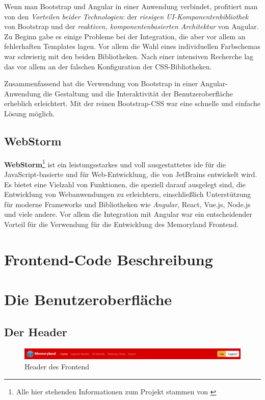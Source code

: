 Wenn man Bootstrap und Angular in einer Anwendung verbindet, profitiert man von den \emph{Vorteilen beider Technologien}: der \emph{riesigen UI-Komponentenbibliothek} von Bootstrap und der \emph{reaktiven, komponentenbasierten Architektur} von Angular. Zu Beginn gabe es einige Probleme bei der Integration, die aber vor allem an fehlerhaften Templates lagen. Vor allem die Wahl eines individuellen Farbschemas war schwierig mit den beiden Bibliotheken. Nach einer intensiven Recherche lag das vor allem an der falschen Konfiguration der CSS-Bibliotheken.

Zusammenfassend hat die Verwendung von Bootstrap in einer Angular-Anwendung die Gestaltung und die Interaktivität der Benutzeroberfläche erheblich erleichtert. Mit der reinen Bootstrap-CSS war eine schnelle und einfache Lösung möglich.


\subsection{WebStorm}

\textbf{WebStorm}\footnote{Alle hier stehenden Informationen zum Projekt stammen von \cite{Webstorm}}  ist ein leistungsstarkes und voll ausgestattetes \Gls{ide} für die JavaScript-basierte und für Web-Entwicklung, die von JetBrains entwickelt wird. Es bietet eine Vielzahl von Funktionen, die speziell darauf ausgelegt sind, die Entwicklung von Webanwendungen zu erleichtern, einschlie\ss{}lich Unterstützung für moderne Frameworks und Bibliotheken wie \emph{Angular}, React, Vue.js, Node.js und viele andere. Vor allem die Integration mit Angular war ein entscheidender Vorteil für die Verwendung für die Entwicklung des Memoryland Frontend.


\section{Frontend-Code Beschreibung}



\section{Die Benutzeroberfläche}

\subsection{Der Header}

\begin{figure} [h t]
    \centering
    \includegraphics[scale=0.5]{pics/header_login.PNG}
    \caption{Header des Frontend}
    \label{fig:header-frontend}
\end{figure}

